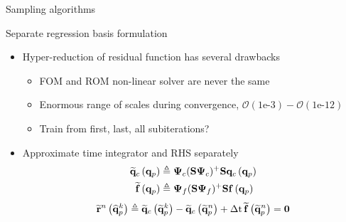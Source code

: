 \documentclass[]{beamer}
\begin{document}
\begin{frame}{Sampling algorithms}
    
\end{frame}

\begin{frame}{Separate regression basis formulation}
    \begin{itemize}
		\item Hyper-reduction of residual function has several drawbacks
		\begin{itemize}
			\item FOM and ROM non-linear solver are never the same
			\item Enormous range of scales during convergence, $\mathcal{O}(1\text{e-}3)-\mathcal{O}(1\text{e-}12)$
			\item Train from first, last, all subiterations?
		\end{itemize}
		\item Approximate time integrator and RHS separately
		\begin{align*}
			\consFuncRom{\primVec} &\triangleq \deimRegressorCons \consFunc{\primVec} \\
			\rhsApproxFunc{\primVec} &\triangleq \deimRegressorRhs \rhsFunc{\primVec}
		\end{align*}
		\begin{equation*}
			\mathbf{\widetilde{r}}^{n} \left(\mathbf{\widehat{q}}_p^{k}\right) \triangleq \mathbf{\widetilde{q}}_c \left(\mathbf{\widetilde{q}}_p^{k}\right) - \mathbf{\widetilde{q}}_c \left(\mathbf{\widetilde{q}}_p^{n}\right) + \Delta \text{t} \, \mathbf{\widetilde{\mathbf{f}}}\left(\mathbf{\widetilde{q}}_p^{n}\right) = \mathbf{0}
		\end{equation*}
	\end{itemize}
\end{frame}
\end{document}
